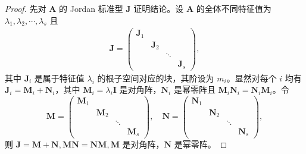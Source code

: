 \documentclass[../../main.tex]{subfiles}
\begin{document}
\begin{proof}
先对 $\boldsymbol{A}$ 的 Jordan 标准型 $\boldsymbol{J}$ 证明结论。设 $\boldsymbol{A}$ 的全体不同特征值为 $\lambda_1, \lambda_2, \cdots, \lambda_s$ 且
\begin{align*}
\boldsymbol{J} = 
\begin{pmatrix}
\boldsymbol{J}_1 & & & \\
 & \boldsymbol{J}_2 & & \\
 & & \ddots & \\
 & & & \boldsymbol{J}_s
\end{pmatrix},
\end{align*}
其中 $\boldsymbol{J}_i$ 是属于特征值 $\lambda_i$ 的根子空间对应的块，其阶设为 $m_i$。显然对每个 $i$ 均有 $\boldsymbol{J}_i = \boldsymbol{M}_i + \boldsymbol{N}_i$，其中 $\boldsymbol{M}_i = \lambda_i\boldsymbol{I}$ 是对角阵，$\boldsymbol{N}_i$ 是幂零阵且 $\boldsymbol{M}_i\boldsymbol{N}_i = \boldsymbol{N}_i\boldsymbol{M}_i$。令
\[
\boldsymbol{M} = 
\begin{pmatrix}
\boldsymbol{M}_1 & & & \\
 & \boldsymbol{M}_2 & & \\
 & & \ddots & \\
 & & & \boldsymbol{M}_s
\end{pmatrix}, \quad
\boldsymbol{N} = 
\begin{pmatrix}
\boldsymbol{N}_1 & & & \\
 & \boldsymbol{N}_2 & & \\
 & & \ddots & \\
 & & & \boldsymbol{N}_s
\end{pmatrix},
\]
则 $\boldsymbol{J} = \boldsymbol{M} + \boldsymbol{N}, \boldsymbol{MN} = \boldsymbol{NM}, \boldsymbol{M}$ 是对角阵，$\boldsymbol{N}$ 是幂零阵。


\end{proof}
\end{document}
